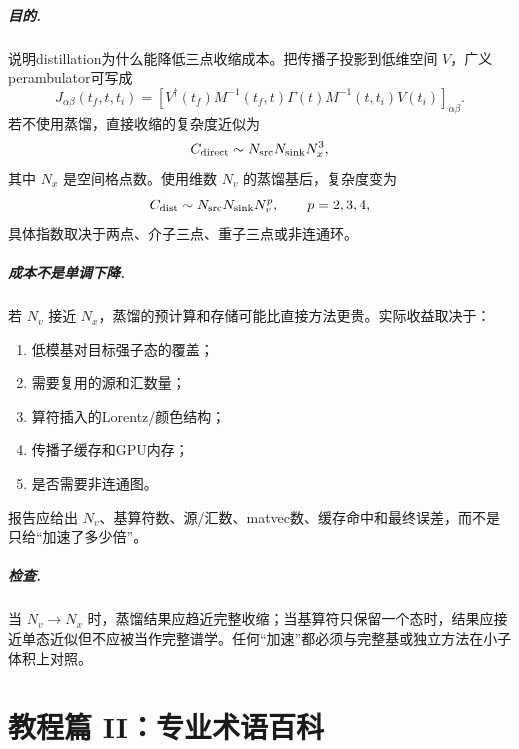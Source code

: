 \documentclass[UTF8,12pt,a4paper,twoside,openany]{ctexbook}
\begin{document}
\paragraph{目的.} 说明distillation为什么能降低三点收缩成本。把传播子投影到低维空间 \(V\)，广义perambulator可写成
\begin{equation}
  J_{\alpha\beta}(t_f,t,t_i)
  =\left[V^\dagger(t_f)M^{-1}(t_f,t)
  \Gamma(t)M^{-1}(t,t_i)V(t_i)\right]_{\alpha\beta}.
  \label{eq:tutorial-perambulator}
\end{equation}
若不使用蒸馏，直接收缩的复杂度近似为
\begin{equation}
  C_{\rm direct}\sim N_{\rm src}N_{\rm sink}N_x^3,
  \label{eq:tutorial-direct-cost}
\end{equation}
其中 \(N_x\) 是空间格点数。使用维数 \(N_v\) 的蒸馏基后，复杂度变为
\begin{equation}
  C_{\rm dist}\sim N_{\rm src}N_{\rm sink}N_v^p,
  \qquad p=2,3,4,
  \label{eq:tutorial-dist-cost}
\end{equation}
具体指数取决于两点、介子三点、重子三点或非连通环。

\paragraph{成本不是单调下降.} 若 \(N_v\) 接近 \(N_x\)，蒸馏的预计算和存储可能比直接方法更贵。实际收益取决于：
\begin{enumerate}
  \item 低模基对目标强子态的覆盖；
  \item 需要复用的源和汇数量；
  \item 算符插入的Lorentz/颜色结构；
  \item 传播子缓存和GPU内存；
  \item 是否需要非连通图。
\end{enumerate}
报告应给出 \(N_v\)、基算符数、源/汇数、matvec数、缓存命中和最终误差，而不是只给“加速了多少倍”。

\paragraph{检查.} 当 \(N_v\to N_x\) 时，蒸馏结果应趋近完整收缩；当基算符只保留一个态时，结果应接近单态近似但不应被当作完整谱学。任何“加速”都必须与完整基或独立方法在小子体积上对照。

\clearpage
\chapter{教程篇 II：专业术语百科}
\label{sec:glossary}
\end{document}
